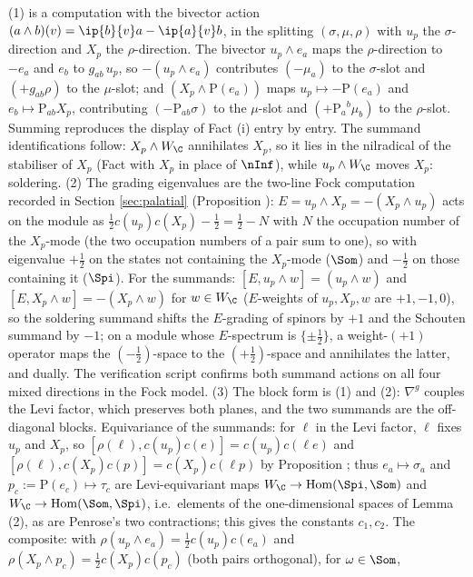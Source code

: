 (1) is a computation with the bivector action $(a\wedge b)(v) = \ip{b}{v}a - \ip{a}{v}b$, in the splitting $(\sigma, \mu, \rho)$ with $u_p$ the $\sigma$-direction and $X_p$ the $\rho$-direction. The bivector $u_p\wedge e_a$ maps the $\rho$-direction to $-e_a$ and $e_b$ to $g_{ab}\,u_p$, so $-(u_p\wedge e_a)$ contributes $(-\mu_a)$ to the $\sigma$-slot and $(+g_{ab}\rho)$ to the $\mu$-slot; and $(X_p\wedge \mathrm{P}(e_a))$ maps $u_p \mapsto -\mathrm{P}(e_a)$ and $e_b \mapsto \mathrm{P}_{ab}X_p$, contributing $(-\mathrm{P}_{ab}\sigma)$ to the $\mu$-slot and $(+\mathrm{P}_a{}^b\mu_b)$ to the $\rho$-slot. Summing reproduces the display of Fact (i) entry by entry. The summand identifications follow: $X_p\wedge W_\C$ annihilates $X_p$, so it lies in the nilradical of the stabiliser of $X_p$ (Fact  with $X_p$ in place of $\nInf$), while $u_p \wedge W_\C$ moves $X_p$: soldering.
(2) The grading eigenvalues are the two-line Fock computation recorded in Section \ref{sec:palatial} (Proposition ): $E = u_p\wedge X_p = -(X_p\wedge u_p)$ acts on the module as $\tfrac12 c(u_p)c(X_p) - \tfrac12 = \tfrac12 - N$ with $N$ the occupation number of the $X_p$-mode (the two occupation numbers of a pair sum to one), so with eigenvalue $+\tfrac12$ on the states not containing the $X_p$-mode ($\Som$) and $-\tfrac12$ on those containing it ($\Spi$). For the summands: $[E, u_p\wedge w] = (u_p\wedge w)$ and $[E, X_p\wedge w] = -(X_p\wedge w)$ for $w \in W_\C$ ($E$-weights of $u_p, X_p, w$ are $+1, -1, 0$), so the soldering summand shifts the $E$-grading of spinors by $+1$ and the Schouten summand by $-1$; on a module whose $E$-spectrum is $\{\pm\tfrac12\}$, a weight-$(+1)$ operator maps the $(-\tfrac12)$-space to the $(+\tfrac12)$-space and annihilates the latter, and dually. The verification script confirms both summand actions on all four mixed directions in the Fock model.
(3) The block form is (1) and (2): $\nabla^g$ couples the Levi factor, which preserves both planes, and the two summands are the off-diagonal blocks. Equivariance of the summands: for $\ell$ in the Levi factor, $\ell$ fixes $u_p$ and $X_p$, so $[\rho(\ell), c(u_p)c(e)] = c(u_p)c(\ell e)$ and $[\rho(\ell), c(X_p)c(p)] = c(X_p)c(\ell p)$ by Proposition ; thus $e_a \mapsto \sigma_a$ and $p_c := \mathrm{P}(e_c) \mapsto \tau_c$ are Levi-equivariant maps $W_\C \to \operatorname{Hom}(\Spi,\Som)$ and $W_\C\to\operatorname{Hom}(\Som,\Spi)$, i.e.\ elements of the one-dimensional spaces of Lemma (2), as are Penrose's two contractions; this gives the constants $c_1, c_2$. The composite: with $\rho(u_p\wedge e_a) = \tfrac12 c(u_p)c(e_a)$ and $\rho(X_p\wedge p_c) = \tfrac12 c(X_p)c(p_c)$ (both pairs orthogonal), for $\omega \in \Som$,
